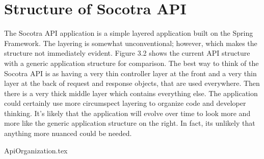 \section{Structure of Socotra API}
The Socotra API application is a simple layered application built on the Spring Framework. The
layering is somewhat unconventional; however, which makes the structure not immediately evident.
Figure 3.2 shows the current API structure with a generic application structure for comparison. The
best way to think of the Socotra API is as having a very thin controller layer at the front and a
very thin layer at the back of request and response objects, that are used everywhere. Then
there is a very thick middle layer which contains everything else. The application could certainly use
more circumspect layering to organize code and developer thinking. It's likely that the application
will evolve over time to look more and more like the generic application structure on the right.
In fact, its unlikely that anything more nuanced could be needed.

{ApiOrganization.tex}


